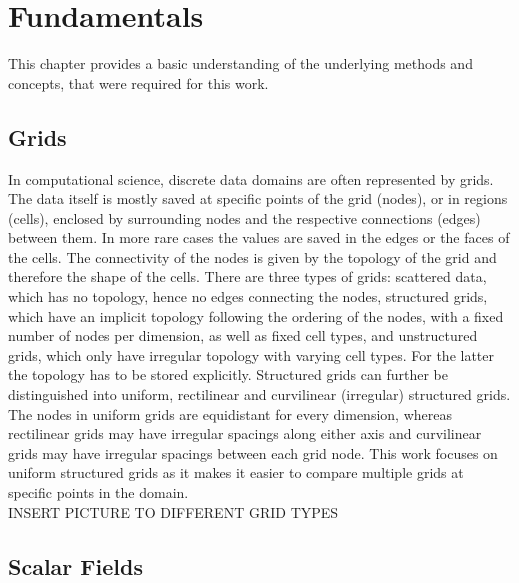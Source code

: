 \chapter{Fundamentals}

This chapter provides a basic understanding of the underlying methods
and concepts, that were required for this work.

\section{Grids}

In computational science, discrete data domains are often represented by
grids. The data itself is mostly saved at specific points of the grid
(nodes), or in regions (cells), enclosed by surrounding nodes and the
respective connections (edges) between them. In more rare cases the
values are saved in the edges or the faces of the cells. The
connectivity of the nodes is given by the topology of the grid and
therefore the shape of the cells. There are three types of grids:
scattered data, which has no topology, hence no edges connecting the
nodes, structured grids, which have an implicit topology following the
ordering of the nodes, with a fixed number of nodes per dimension, as
well as fixed cell types, and unstructured grids, which only have
irregular topology with varying cell types. For the latter the topology
has to be stored explicitly. Structured grids can further be
distinguished into uniform, rectilinear and curvilinear (irregular)
structured grids. The nodes in uniform grids are equidistant for every
dimension, whereas rectilinear grids may have irregular spacings along
either axis and curvilinear grids may have irregular spacings between
each grid node. This work focuses on uniform structured grids as it
makes it easier to compare multiple grids at specific points in the
domain.\\
INSERT PICTURE TO DIFFERENT GRID TYPES

\section{Scalar Fields}

